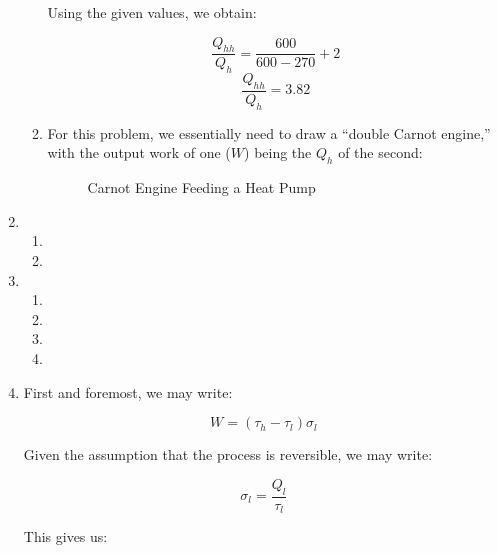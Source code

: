 \begin{enumerate}
\begin{enumerate}
        Using the given values, we obtain:

        $$\frac{Q_{hh}}{Q_h}=\frac{600}{600-270}+2$$
        $$\boxed{\frac{Q_{hh}}{Q_h}=3.82}$$

      \item 

        For this problem, we essentially need to draw a ``double Carnot engine,'' with the output work of one ($W$) being the $Q_h$ of the second:

        \begin{figure}[H]
          \centering
          
          \caption{Carnot Engine Feeding a Heat Pump}
          \label{fig:1}
        \end{figure}

    \end{enumerate}

  \item

    \begin{enumerate}

      \item 

      \item 

    \end{enumerate}

  \item

    \begin{enumerate}

      \item 
        
      \item 
        
      \item 
        
      \item 
        
    \end{enumerate}

    \setcounter{enumi}{4}

  \item

    First and foremost, we may write:

    $$W=(\tau_h-\tau_l)\sigma_l$$

    Given the assumption that the process is reversible, we may write:

    $$\sigma_l=\frac{Q_l}{\tau_l}$$

    This gives us:


\end{enumerate}
